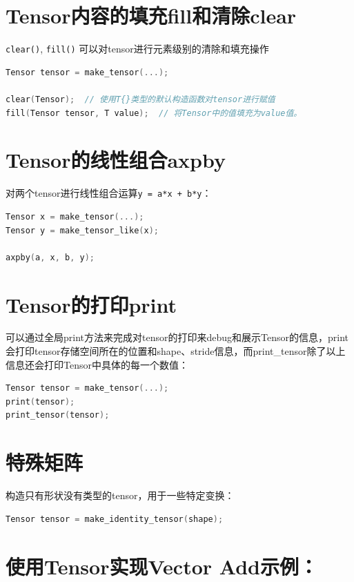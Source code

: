 \section{Tensor内容的填充fill和清除clear}

\verb|clear()|, \verb|fill()| 可以对tensor进行元素级别的清除和填充操作

\begin{lstlisting}[language=C++]
Tensor tensor = make_tensor(...);

clear(Tensor);  // 使用T{}类型的默认构造函数对tensor进行赋值
fill(Tensor tensor, T value);  // 将Tensor中的值填充为value值。
\end{lstlisting}

\section{Tensor的线性组合axpby}

对两个tensor进行线性组合运算\verb|y = a*x + b*y|：

\begin{lstlisting}[language=C++]
Tensor x = make_tensor(...);
Tensor y = make_tensor_like(x);

axpby(a, x, b, y);
\end{lstlisting}

\section{Tensor的打印print}

可以通过全局print方法来完成对tensor的打印来debug和展示Tensor的信息，print会打印tensor存储空间所在的位置和shape、stride信息，而print\_tensor除了以上信息还会打印Tensor中具体的每一个数值：

\begin{lstlisting}[language=C++]
Tensor tensor = make_tensor(...);
print(tensor);
print_tensor(tensor);
\end{lstlisting}

\section{特殊矩阵}

构造只有形状没有类型的tensor，用于一些特定变换：

\begin{lstlisting}[language=C++]
Tensor tensor = make_identity_tensor(shape);
\end{lstlisting}

\section{使用Tensor实现Vector Add示例：}

